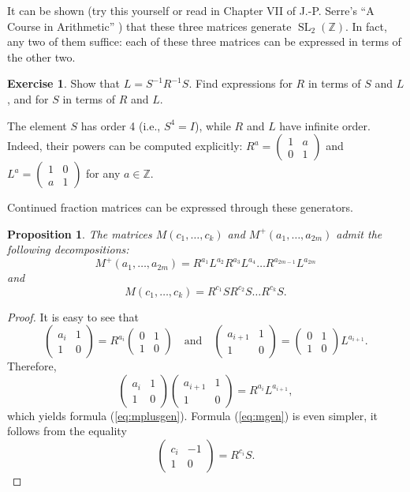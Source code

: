 \documentclass[a4paper,11pt]{amsart}
\newcommand{\ZZ}{{\mathbb{Z}}}
\newcommand{\SL}{\mathop{\mathrm{SL}}}
\theoremstyle{plain}
\newtheorem{prop}[theorem]{Proposition}
\theoremstyle{remark}
\theoremstyle{definition}
\newtheorem{exercise}[theorem]{Exercise}
\numberwithin{equation}{section}
\numberwithin{figure}{section}
\begin{document}
It can be shown (try this yourself or read in Chapter VII of J.-P. Serre's ``A Course in Arithmetic'' \cite{Serre70}) that these three matrices generate $\SL_2(\ZZ)$. In fact, any two of them suffice: each of these three matrices can be expressed in terms of the other two.

\begin{exercise} Show that $L=S^{-1}R^{-1}S$. Find expressions for $R$ in terms of $S$ and $L$, and for $S$ in terms of $R$ and $L$.
\end{exercise}

The element $S$ has order 4 (i.e., $S^4=I$), while $R$ and $L$ have infinite order. Indeed, their powers can be computed explicitly: $R^a=\begin{pmatrix}1 &a\\0&1\end{pmatrix}$ and $L^a=\begin{pmatrix}1 &0\\a&1\end{pmatrix}$ for any $a\in\ZZ$.

Continued fraction matrices can be expressed through these generators.

\begin{prop}
The matrices $M(c_1,\dots,c_k)$ and $M^+(a_1,\dots,a_{2m})$ admit the following decompositions:
\begin{equation}\label{eq:mplusgen}
M^+(a_1,\dots,a_{2m})=R^{a_1}L^{a_2}R^{a_3}L^{a_4}\dots R^{a_{2m-1}}L^{a_{2m}}
\end{equation}
and
\begin{equation}\label{eq:mgen}
M(c_1,\dots,c_k)=R^{c_1}S R^{c_2}S\dots R^{c_k}S.
\end{equation}
\end{prop}

\begin{proof} It is easy to see that
\[
\begin{pmatrix}a_i &1\\1 &0\end{pmatrix}=R^{a_i}\begin{pmatrix}0 &1\\1 &0\end{pmatrix}\quad\text{and}\quad
\begin{pmatrix}a_{i+1} &1\\1 &0\end{pmatrix}=\begin{pmatrix}0 &1\\1 &0\end{pmatrix}L^{a_{i+1}}.
\]
Therefore,
\[
\begin{pmatrix}a_i &1\\1 &0\end{pmatrix}
\begin{pmatrix}a_{i+1} &1\\1 &0\end{pmatrix}=R^{a_i}L^{a_{i+1}},
\]
which yields formula (\ref{eq:mplusgen}). Formula (\ref{eq:mgen}) is even simpler, it follows from the equality
\[
\begin{pmatrix}c_i &-1\\1 &0\end{pmatrix}=R^{c_i}S.
\]
\end{proof}
\end{document}
